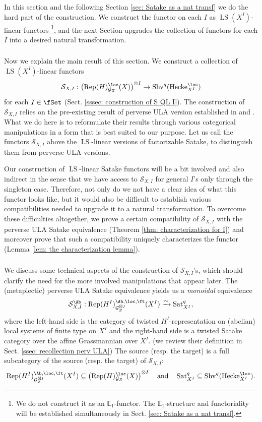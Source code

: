\documentclass[10pt]{amsart}
\newcommand{\sssec}{\subsubsection}
\theoremstyle{remark}
\newcommand{\te}{\text}
\newcommand{\E}{\mathbb{E}}
\newcommand{\on}{\operatorname}
\newcommand{\cG}{\mathcal{G}}
\newcommand{\cS}{\mathcal{S}}
\newcommand{\Rep}{\on{Rep}}
\newcommand{\Shv}{\on{Shv}}
\newcommand{\LS}{\on{LS}}
\newcommand{\Sat}{\on{Sat}}
\newcommand{\Hecke}{\on{Hecke}}
\begin{document}
In this section and the following Section \ref{sec: Satake as a nat transf} we do the hard part of the construction. We construct the functor on each $I$ as $\LS(X^I)$-linear functors \footnote{We do not construct it as an $\E_1$-functor. The $\E_1$-structure and functoriality will be established simultaneously in Sect. \ref{sec: Satake as a nat transf}.}, and the next Section upgrades the collection of functors for each $I$ into a desired natural transformation.

\sssec{}\label{sssec: explaining main results}
Now we explain the main result of this section.
We construct a collection of $\LS(X^I)$-linear functors
\[\cS_{X,I}:\left(\Rep(H)^{\loc}_{\cG_Z}(X)\right)^{\otimes I}\rightarrow \Shv^q(\Hecke^{\loc}_{X^I})\]
for each $I\in\fSet$ (Sect. \ref{sssec: construction of S QL I}). The construction of $\cS_{X,I}$ relies on the pre-existing result of perverse ULA version established in \cite{Rei} and \cite{ZhaoNew}. What we do here is to reformulate their results through various categorical manipulations in a form that is best suited to our purpose. Let us call the functors $\cS_{X,I}$ above the $\LS$-linear versions of factorizable Satake, to distinguish them from perverse ULA versions. 
\medskip

Our construction of $\LS$-linear Satake functors will be a bit involved and also indirect in the sense that we have access to $\cS_{X,I}$ for general $I$'s only through the singleton case. Therefore, not only do we not have a clear idea of what this functor looks like, but it would also be difficult to establish various compatibilities needed to upgrade it to a natural transformation. To overcome these difficulties altogether, we prove a certain compatibility of $\cS_{X,I}$ with the perverse ULA Satake equivalence (Theorem \ref{thm: characterization for I}) and moreover prove that such a compatibility uniquely characterizes the functor (Lemma \ref{lem: the characterization lemma}).

\sssec{}\label{sssec: technical aspects LS linear}
We discuss some technical aspects of the construction of $\cS_{X,I}$'s, which should clarify the need for the more involved manipulations that appear later. The (metaplectic) perverse ULA Satake equivalence yields us a \emph{monoidal} equivalence
\[\cS^{\Ab}_{X,I}:\Rep(H^I)^{\Ab,\loc,\ft}_{\cG^{\boxtimes I}_Z}(X^I)\xrightarrow{\sim}\Sat^q_{X^I},\]
where the left-hand side is the category of twisted $H^I$-representation on (abelian) local systems of finite type on $X^I$ and the right-hand side is a twisted Satake category over the affine Grassmannian over $X^I$. (we review their definition in Sect. \ref{ssec: recollection perv ULA}) The source (resp. the target) is a full subcategory of the source (resp. the target) of $\cS_{X,I}$:
\[\Rep(H^I)^{\Ab,\loc,\ft}_{\cG^{\boxtimes I}_Z}(X^I)\subseteq \left(\Rep(H)^{\loc}_{\cG_Z}(X)\right)^{\otimes I}\quad\te{and}\quad \Sat^q_{X^I}\subseteq \Shv^q(\Hecke^{\loc}_{X^I}).\]
\end{document}
